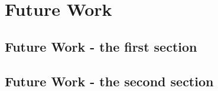 \chapter{Future Work}
    \blindtext[10]
    \newpage
    \section{Future Work - the first section}
        \blindtext[10] 
        \newpage
    \section{Future Work - the second section}
        \blindtext[10]
        \newpage